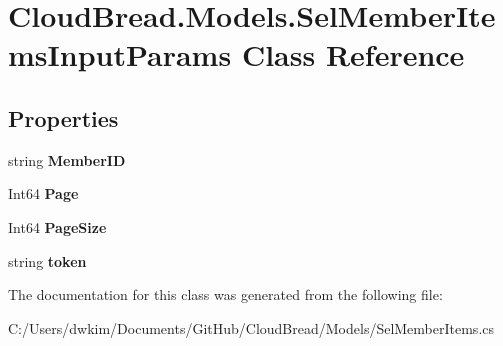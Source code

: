 \hypertarget{a00100}{}\section{Cloud\+Bread.\+Models.\+Sel\+Member\+Items\+Input\+Params Class Reference}
\label{a00100}
\subsection*{Properties}
\begin{DoxyCompactItemize}
\item 
string {\bfseries Member\+ID}\hypertarget{a00100_a4492f522f56647868cc6a5aedb1cf839}{}\label{a00100_a4492f522f56647868cc6a5aedb1cf839}

\item 
Int64 {\bfseries Page}\hypertarget{a00100_a3ad769e53ab4197da060d2e50e1f2404}{}\label{a00100_a3ad769e53ab4197da060d2e50e1f2404}

\item 
Int64 {\bfseries Page\+Size}\hypertarget{a00100_a40a4d262ac277633e6737e32d09aac85}{}\label{a00100_a40a4d262ac277633e6737e32d09aac85}

\item 
string {\bfseries token}\hypertarget{a00100_a766736df6ed0179e93db76f96d2b8c7d}{}\label{a00100_a766736df6ed0179e93db76f96d2b8c7d}

\end{DoxyCompactItemize}


The documentation for this class was generated from the following file\+:\begin{DoxyCompactItemize}
\item 
C\+:/\+Users/dwkim/\+Documents/\+Git\+Hub/\+Cloud\+Bread/\+Models/Sel\+Member\+Items.\+cs\end{DoxyCompactItemize}
